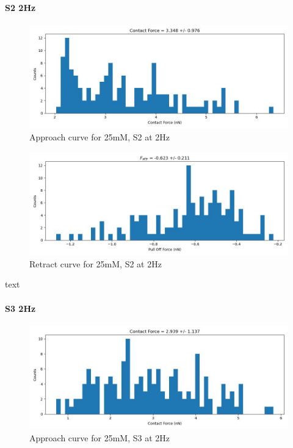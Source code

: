 \paragraph{S2 2Hz}
\begin{figure}[h!]
\centering
\includegraphics[width=\textwidth]{chapter7/Tip speed/25mM/S2 2Hz/approach_f_c_hist.jpg}
\caption{Approach curve for 25mM, S2 at 2Hz}
\end{figure}

\begin{figure}[h!]
\centering
\includegraphics[width=\textwidth]{chapter7/Tip speed/25mM/S2 2Hz/retract_f_a_hist.jpg}
\caption{Retract curve for 25mM, S2 at 2Hz}
\end{figure}
text
\newpage

\paragraph{S3 2Hz}
\begin{figure}[h!]
\centering
\includegraphics[width=\textwidth]{chapter7/Tip speed/25mM/S3 2Hz/approach_f_c_hist.jpg}
\caption{Approach curve for 25mM, S3 at 2Hz}
\end{figure}

